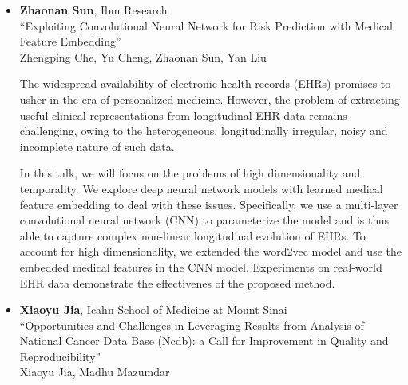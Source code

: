 \begin{itemize}
\item \textbf{Zhaonan Sun}, Ibm Research \\
``Exploiting Convolutional Neural Network for Risk Prediction with Medical Feature Embedding'' \\
Zhengping Che, Yu Cheng, Zhaonan Sun, Yan Liu


The widespread availability of electronic health records (EHRs) promises to usher in the era of personalized medicine. However, the problem of extracting useful clinical representations from longitudinal EHR data remains challenging, owing to the heterogeneous, longitudinally irregular, noisy and incomplete nature of such data.

In this talk, we will focus on the problems of high dimensionality and temporality. We explore deep neural network models with learned medical feature embedding to deal with these issues. Specifically, we use a multi-layer convolutional neural network (CNN) to parameterize the model and is thus able to capture complex non-linear longitudinal evolution of EHRs. To account for high dimensionality, we extended the word2vec model and use the embedded medical features in the CNN model. Experiments on real-world EHR data demonstrate the effectivenes of the proposed method. 

\item \textbf{Xiaoyu Jia}, Icahn School of Medicine at Mount Sinai \\
``Opportunities and Challenges in Leveraging Results from Analysis of National Cancer Data Base (Ncdb): a Call for Improvement in Quality and Reproducibility'' \\
Xiaoyu Jia, Madhu Mazumdar



\end{itemize}
